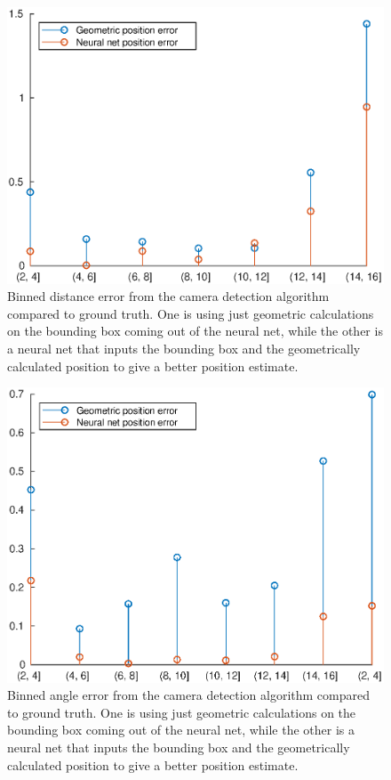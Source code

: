 \iffalse
\begin{figure}
    \centering
    \includegraphics[width=0.5\linewidth]{0_Images/3_Theory/camDetection/rErrorCamera.eps}
    \caption[Binned distance error from the camera detection algorithm.]
    {Binned distance error from the camera detection algorithm compared to ground truth. One is using just geometric calculations on the bounding box coming out of the neural net, while the other is a neural net that inputs the bounding box and the geometrically calculated position to give a better position estimate.}
    \label{Fig:CameraRError}
\end{figure}

\begin{figure}
    \centering
    \includegraphics[width=0.5\linewidth]{0_Images/3_Theory/camDetection/psiErrorCamera.eps}
    \caption[Binned angle error from the camera detection algorithm.]
    {Binned angle error from the camera detection algorithm compared to ground truth. One is using just geometric calculations on the bounding box coming out of the neural net, while the other is a neural net that inputs the bounding box and the geometrically calculated position to give a better position estimate.}
    \label{Fig:CameraPsiError}
\end{figure}

